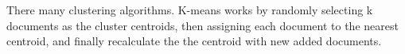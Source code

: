 


There many clustering algorithms. K-means works by randomly selecting k documents as the cluster centroids, then assigning each document to the nearest centroid, and finally recalculate the the centroid with new added documents. 


